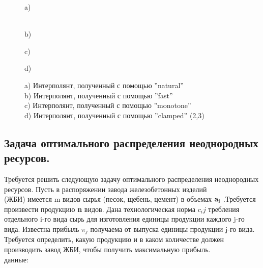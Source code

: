 \documentclass[russian,utf8,nocolumnxxxi,nocolumnxxxii]{eskdtext}
\begin{document}
\begin{figure}[H]
\begin{minipage}[h]{0.47\linewidth}
 a) \\
\end{minipage}
\hfill
\begin{minipage}[h]{0.47\linewidth}
 \\b)
\end{minipage}
\vfill
\begin{minipage}[h]{0.47\linewidth}
 c) \\
\end{minipage}
\hfill
\begin{minipage}[h]{0.47\linewidth}
 d) \\
\end{minipage}
\caption{ a) Интерполянт, полученный с помощью ”natural”\\ b)
Интерполянт, полученный с помощью ”fast”\\ c) Интерполянт, полученный с помощью ”monotone” \\d) Интерполянт, полученный с помощью ”clamped” (2,3)}
\label{ris:experimentalcorrelationsignals}
\end{figure}

\newpage
\begin{flushleft}
\section{Задача оптимального распределения неоднородных ресурсов.}
Требуется решить следующую задачу оптимального распределения неоднородных ресурсов. Пусть в распоряжении завода железобетонных изделий\\ (ЖБИ) имеется m видов сырья (песок, щебень, цемент) в объемах ${\bf a_i}$  .Требуется произвести продукцию {\bf n} видов. Дана технологическая норма $c_ij$  требления отдельного i-го вида сырь для изготовления единицы продукции каждого j-го вида. Известна прибыль $\pi_j$  получаема от выпуска единицы продукции j-го вида. Требуется определить, какую продукцию и в каком количестве должен производить завод ЖБИ, чтобы получить максимальную прибыль.\\
{ данные:}\\
\end{flushleft}
\begin{figure}[h]
  \\
\end{figure}
\end{document}
